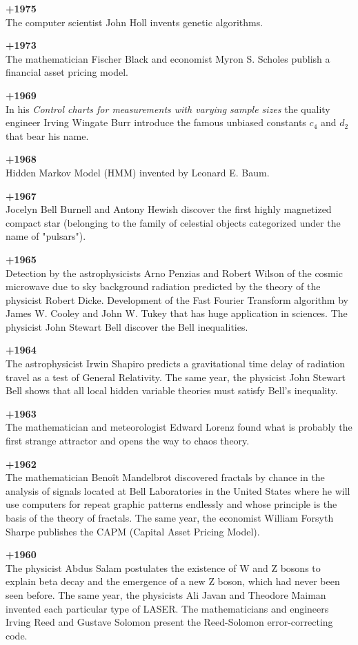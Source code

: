\textbf{+1975}\\
The computer scientist John Holl invents genetic algorithms.

\textbf{+1973}\\
The mathematician Fischer Black and economist Myron S. Scholes publish a financial asset pricing model.

\textbf{+1969}\\
In his \textit{Control charts for measurements with varying sample sizes} the quality engineer Irving Wingate Burr introduce the famous unbiased constants $c_4$ and $d_2$ that bear his name.

\textbf{+1968}\\
Hidden Markov Model (HMM) invented by Leonard E. Baum.

\textbf{+1967}\\
Jocelyn Bell Burnell and Antony Hewish discover the first highly magnetized compact star (belonging to the family of celestial objects categorized under the name of "pulsars").

\textbf{+1965}\\
Detection by the astrophysicists Arno Penzias and Robert Wilson of the cosmic microwave due to sky background radiation predicted by the theory of the physicist Robert Dicke. Development of the Fast Fourier Transform algorithm by James W. Cooley and John W. Tukey that has huge application in sciences. The physicist John Stewart Bell discover the Bell inequalities.

\textbf{+1964}\\
The astrophysicist Irwin Shapiro predicts a gravitational time delay of radiation travel as a test of General Relativity. The same year, the physicist John Stewart Bell shows that all local hidden variable theories must satisfy Bell's inequality.

\textbf{+1963}\\
The mathematician and meteorologist Edward Lorenz found what is probably the first strange attractor and opens the way to chaos theory.

\textbf{+1962}\\
The mathematician Benoît Mandelbrot discovered fractals by chance in the analysis of signals located at Bell Laboratories in the United States where he will use computers for repeat graphic patterns endlessly and whose principle is the basis of the theory of fractals. The same year, the economist William Forsyth Sharpe publishes the CAPM (Capital Asset Pricing Model). 

\textbf{+1960}\\
The physicist Abdus Salam postulates the existence of W and Z bosons to explain beta decay and the emergence of a new Z boson, which had never been seen before. The same year, the physicists Ali Javan and Theodore Maiman invented each particular type of LASER. The mathematicians and engineers Irving Reed and Gustave Solomon present the Reed-Solomon error-correcting code.

